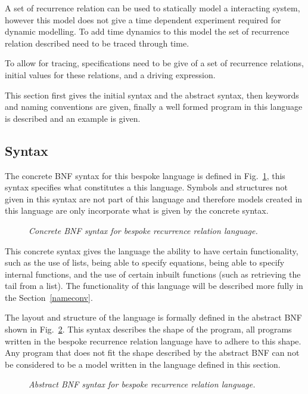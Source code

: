\documentclass{article}
\begin{document}
A set of recurrence relation can be used to statically model a interacting system, however this model does not give a time dependent  experiment required for dynamic modelling. To add time dynamics to this model the set of recurrence relation described need to be traced through time.

To allow for tracing, specifications need to be give of a set of recurrence relations, initial values for these relations, and a driving expression. 

This section first gives the initial syntax and the abstract syntax, then keywords and naming conventions are given, finally a well formed program in this language is described and an example is given.  
 


\subsection{Syntax}
The concrete BNF syntax for this bespoke language is defined in Fig.~\ref{fig:bnflex}, this syntax specifies what constitutes a this language. Symbols and structures not given in this syntax are not part of this language and therefore models created in this language are only incorporate what is given by the concrete syntax. 
\begin{figure}[H]
	\centering
	
	\caption{\it Concrete BNF syntax for bespoke recurrence relation language.}
	\label{fig:bnflex}
\end{figure} 

This concrete syntax gives the language the ability to have certain functionality, such as the use of lists, being able to specify equations, being able to specify internal functions, and the use of certain inbuilt functions (such as retrieving the tail from a list). The functionality of this language will be described more fully in the Section~\ref{nameconv}.

The layout and structure of the language is formally defined in the abstract BNF shown in Fig.~\ref{fig:BNF}. This syntax describes the shape of the program, all programs written in the bespoke recurrence relation language have to adhere to this shape. Any program that does not fit the shape described by the abstract BNF can not be considered to be a model written in the language defined in this section.  
\begin{figure}[H]
	\centering
	
	\caption{\it Abstract BNF syntax for bespoke recurrence relation language.}
	\label{fig:BNF}
\end{figure} 
\end{document}
